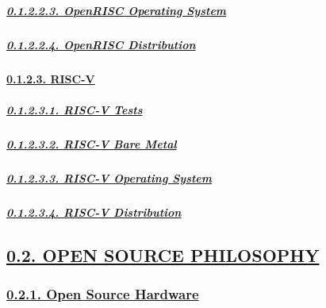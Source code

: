 \documentclass[
]{article}
\begin{document}
\hypertarget{openrisc-operating-system}{%
\subparagraph{\texorpdfstring{\protect\hyperlink{openrisc-operating-system-1}{0.1.2.2.3.
OpenRISC Operating
System}}{0.1.2.2.3. OpenRISC Operating System}}\label{openrisc-operating-system}}

\hypertarget{openrisc-distribution}{%
\subparagraph{\texorpdfstring{\protect\hyperlink{openrisc-distribution-1}{0.1.2.2.4.
OpenRISC
Distribution}}{0.1.2.2.4. OpenRISC Distribution}}\label{openrisc-distribution}}

\hypertarget{risc-v}{%
\paragraph{\texorpdfstring{\protect\hyperlink{risc-v-3}{0.1.2.3.
RISC-V}}{0.1.2.3. RISC-V}}\label{risc-v}}

\hypertarget{risc-v-tests}{%
\subparagraph{\texorpdfstring{\protect\hyperlink{risc-v-tests-1}{0.1.2.3.1.
RISC-V Tests}}{0.1.2.3.1. RISC-V Tests}}\label{risc-v-tests}}

\hypertarget{risc-v-bare-metal}{%
\subparagraph{\texorpdfstring{\protect\hyperlink{risc-v-bare-metal-1}{0.1.2.3.2.
RISC-V Bare
Metal}}{0.1.2.3.2. RISC-V Bare Metal}}\label{risc-v-bare-metal}}

\hypertarget{risc-v-operating-system}{%
\subparagraph{\texorpdfstring{\protect\hyperlink{risc-v-operating-system-1}{0.1.2.3.3.
RISC-V Operating
System}}{0.1.2.3.3. RISC-V Operating System}}\label{risc-v-operating-system}}

\hypertarget{risc-v-distribution}{%
\subparagraph{\texorpdfstring{\protect\hyperlink{risc-v-distribution-1}{0.1.2.3.4.
RISC-V
Distribution}}{0.1.2.3.4. RISC-V Distribution}}\label{risc-v-distribution}}

\hypertarget{open-source-philosophy}{%
\subsection{\texorpdfstring{\protect\hyperlink{open-source-philosophy-1}{0.2.
OPEN SOURCE
PHILOSOPHY}}{0.2. OPEN SOURCE PHILOSOPHY}}\label{open-source-philosophy}}

\hypertarget{open-source-hardware}{%
\subsubsection{\texorpdfstring{\protect\hyperlink{open-source-hardware-1}{0.2.1.
Open Source
Hardware}}{0.2.1. Open Source Hardware}}\label{open-source-hardware}}
\end{document}
